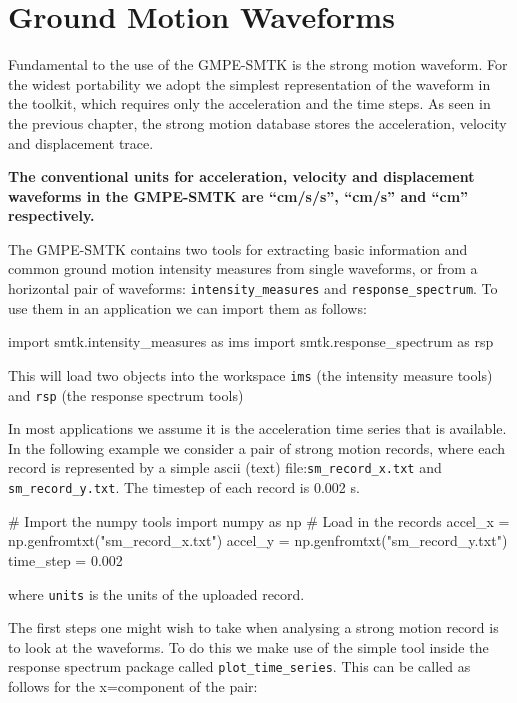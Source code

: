 \section{Ground Motion Waveforms}
\label{sec:ims}

Fundamental to the use of the GMPE-SMTK is the strong motion waveform. For the widest portability we adopt the simplest representation of the waveform in the toolkit, which requires only the acceleration and the time steps. As seen in the previous chapter, the strong motion database stores the acceleration, velocity and displacement trace. 

\textbf{The conventional units for acceleration, velocity and displacement waveforms in the GMPE-SMTK are ``cm/s/s'', ``cm/s'' and ``cm'' respectively.}

The GMPE-SMTK contains two tools for extracting basic information and common ground motion intensity measures from single waveforms, or from a horizontal pair of waveforms: \verb=intensity_measures= and \verb=response_spectrum=. To use them in an application we can import them as follows:

\begin{python}[frame=single]
import smtk.intensity_measures as ims
import smtk.response_spectrum as rsp
\end{python}

This will load two objects into the workspace \verb=ims= (the intensity measure tools) and \verb=rsp= (the response spectrum tools)

In most applications we assume it is the acceleration time series that is available. In the following example we consider a pair of strong motion records, where each record is represented by a simple ascii (text) file:\verb=sm_record_x.txt= and \verb=sm_record_y.txt=. The timestep of each record is 0.002 s.

\begin{python}[frame=single]
# Import the numpy tools
import numpy as np
# Load in the records
accel_x = np.genfromtxt("sm_record_x.txt")
accel_y = np.genfromtxt("sm_record_y.txt")
time_step = 0.002
\end{python}

\noindent where \verb=units= is the units of the uploaded record. 

\noindent The first steps one might wish to take when analysing a strong motion record is to look at the waveforms. To do this we make use of the simple tool inside the response spectrum package called \verb=plot_time_series=.
This can be called as follows for the x=component of the pair:


